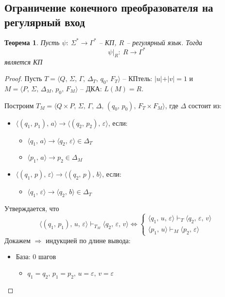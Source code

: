 \documentclass[a4paper,12pt]{article}
\theoremstyle{plain}
\newtheorem{theorem}{Теорема}[subsection]
\theoremstyle{definition}
\theoremstyle{remark}
\begin{document}
\subsection{Ограничение конечного преобразователя на регулярный вход}
\begin{theorem}
	Пусть $\psi :\: \Sigma^* \to \Gamma^*$ -- КП, $R$ -- регулярный язык. Тогда
	\[
		\psi\vert_R:\:R\to\Gamma^*
	\]
	является КП
\end{theorem}

\begin{proof}
	Пусть $T = \langle Q,\,\Sigma,\,\Gamma,\,\Delta_T,\, q_0,\, F_T\rangle$ -- КПтель: $\vert u\vert+\vert v\vert=1$ и $M = \langle P,\, \Sigma,\, \Delta_M,\, p_0,\, F_M\rangle$ -- ДКА: $L(M) = R$.

	Построим $T_M = \langle Q\times P,\, \Sigma,\, \Gamma,\, \Delta,\, (q_0,\, p_0),\, F_T\times F_M\rangle$, где $\Delta$ состоит из:
	\begin{itemize}
		\item $\langle(q_1,\,p_1),\, a\rangle\to\langle(q_2,\,p_2),\,\varepsilon\rangle$, если:
		      \begin{itemize}
			      \item $\langle q_1,\,a\rangle\to\langle q_2,\,\varepsilon\rangle\in\Delta_T$
			      \item $\langle p_1,\,a\rangle\to p_2 \in \Delta_M$
		      \end{itemize}
		\item $\langle(q_1,\,p),\,\varepsilon\rangle\to\langle(q_2,\,p),\,b\rangle$, если:
		      \begin{itemize}
			      \item $\langle q_1,\,\varepsilon\rangle\to\langle q_2,\,b\rangle\in\Delta_T$
		      \end{itemize}
	\end{itemize}
	Утверждается, что
	\[
		\langle(q_1,\,p_1),\,u,\,\varepsilon\rangle\vdash_{T_M}\langle q_2,\,\varepsilon,\,v\rangle \Leftrightarrow\begin{cases}
			\langle q_1,\,u,\,\varepsilon\rangle\vdash_T\langle q_2,\,\varepsilon,\,v\rangle \\
			\langle p_1,\,u\rangle\vdash_M\langle p_2,\,\varepsilon\rangle
		\end{cases}
	\]
	Докажем $\Rightarrow$ индукцией по длине вывода:
	\begin{itemize}
		\item База: 0 шагов
		      \begin{itemize}
			      \item $q_1 = q_2,\, p_1 = p_2,\, u = \varepsilon,\, v = \varepsilon$

\end{itemize}
\end{itemize}
\end{proof}
\end{document}
